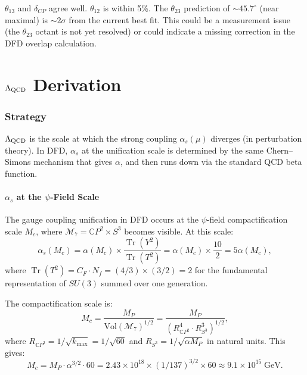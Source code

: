 \documentclass[11pt,a4paper]{article}
\theoremstyle{remark}
\newcommand{\CP}{\mathbb{C}P}
\newcommand{\Tr}{\operatorname{Tr}}
\begin{document}
\begin{tcolorbox}[colback=yellow!5!white, colframe=dfdred!70!black,
  title=PMNS: Partial Success]
$\theta_{13}$ and $\delta_{CP}$ agree well. $\theta_{12}$ is within 5\%.
The $\theta_{23}$ prediction of $\sim 45.7^\circ$ (near maximal) is
$\sim 2\sigma$ from the current best fit. This could be a measurement
issue (the $\theta_{23}$ octant is not yet resolved) or could indicate
a missing correction in the DFD overlap calculation.
\end{tcolorbox}


\newpage
\part{$\Lambda_{\rm QCD}$ Derivation}
\label{part:Lambda-QCD}

\section{Strategy}

$\Lambda_{\rm QCD}$ is the scale at which the strong coupling $\alpha_s(\mu)$
diverges (in perturbation theory). In DFD, $\alpha_s$ at the unification
scale is determined by the same Chern--Simons mechanism that gives $\alpha$,
and then runs down via the standard QCD beta function.

\subsection{$\alpha_s$ at the $\psi$-Field Scale}

The gauge coupling unification in DFD occurs at the $\psi$-field compactification
scale $M_c$, where $\mathcal{M}_7 = \CP^2 \times S^3$ becomes visible.
At this scale:
\begin{equation}
\alpha_s(M_c) = \alpha(M_c) \times \frac{\Tr(Y^2)}{\Tr(T^2)} = \alpha(M_c) \times \frac{10}{2} = 5\alpha(M_c),
\end{equation}
where $\Tr(T^2) = C_F \cdot N_f = (4/3) \times (3/2) = 2$ for the
fundamental representation of $SU(3)$ summed over one generation.

The compactification scale is:
\begin{equation}
M_c = \frac{M_P}{\mathrm{Vol}(\mathcal{M}_7)^{1/2}} = \frac{M_P}{(R_{\CP^2}^4 \cdot R_{S^3}^3)^{1/2}},
\end{equation}
where $R_{\CP^2} = 1/\sqrt{k_{\max}} = 1/\sqrt{60}$ and $R_{S^3} = 1/\sqrt{\alpha M_P}$
in natural units. This gives:
\begin{equation}
M_c = M_P \cdot \alpha^{3/2} \cdot 60 = 2.43 \times 10^{18} \times (1/137)^{3/2} \times 60
\approx 9.1 \times 10^{15}\;\text{GeV}.
\end{equation}
\end{document}
